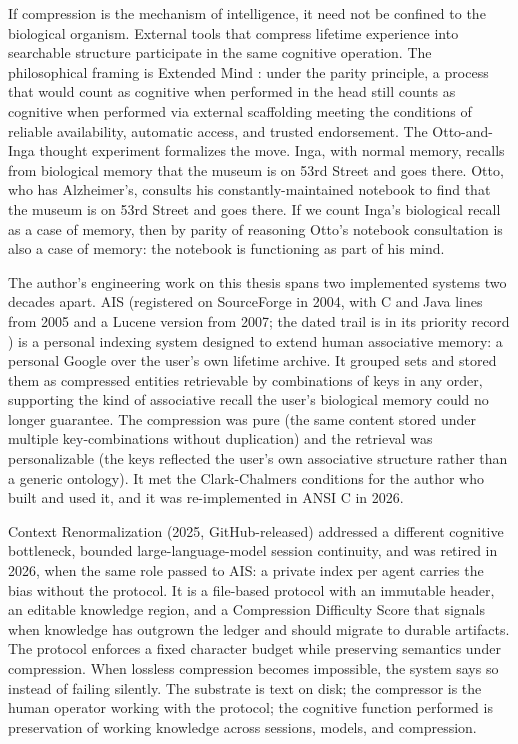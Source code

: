 \documentclass[11pt]{article}
\begin{document}
If compression is the mechanism of intelligence, it need not be confined to the biological organism. External tools that compress lifetime experience into searchable structure participate in the same cognitive operation. The philosophical framing is Extended Mind \citep{clark_chalmers_1998}: under the parity principle, a process that would count as cognitive when performed in the head still counts as cognitive when performed via external scaffolding meeting the conditions of reliable availability, automatic access, and trusted endorsement. The Otto-and-Inga thought experiment formalizes the move. Inga, with normal memory, recalls from biological memory that the museum is on 53rd Street and goes there. Otto, who has Alzheimer's, consults his constantly-maintained notebook to find that the museum is on 53rd Street and goes there. If we count Inga's biological recall as a case of memory, then by parity of reasoning Otto's notebook consultation is also a case of memory: the notebook is functioning as part of his mind.

The author's engineering work on this thesis spans two implemented systems two decades apart. AIS (registered on SourceForge in 2004, with C and Java lines from 2005 and a Lucene version from 2007; the dated trail is in its priority record \citep{gavrilov_ais_priority_2026}) is a personal indexing system designed to extend human associative memory: a personal Google over the user's own lifetime archive. It grouped sets and stored them as compressed entities retrievable by combinations of keys in any order, supporting the kind of associative recall the user's biological memory could no longer guarantee. The compression was pure (the same content stored under multiple key-combinations without duplication) and the retrieval was personalizable (the keys reflected the user's own associative structure rather than a generic ontology). It met the Clark-Chalmers conditions for the author who built and used it, and it was re-implemented in ANSI C in 2026.

Context Renormalization \citep{gavrilov_context_renorm_2026} (2025, GitHub-released) addressed a different cognitive bottleneck, bounded large-language-model session continuity, and was retired in 2026, when the same role passed to AIS: a private index per agent carries the bias without the protocol. It is a file-based protocol with an immutable header, an editable knowledge region, and a Compression Difficulty Score that signals when knowledge has outgrown the ledger and should migrate to durable artifacts. The protocol enforces a fixed character budget while preserving semantics under compression. When lossless compression becomes impossible, the system says so instead of failing silently. The substrate is text on disk; the compressor is the human operator working with the protocol; the cognitive function performed is preservation of working knowledge across sessions, models, and compression.
\end{document}
